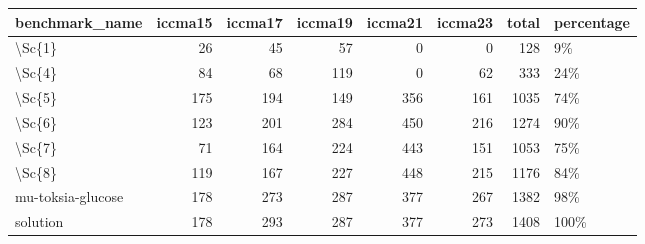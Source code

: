 \begin{tabular}{lrrrrrrl}
\toprule
benchmark\_name &  iccma15 &  iccma17 &  iccma19 &  iccma21 &  iccma23 &  total & percentage \\
\midrule
\textbackslash Sc\{1\}            &       26 &       45 &       57 &        0 &        0 &    128 &         9\% \\
\textbackslash Sc\{4\}            &       84 &       68 &      119 &        0 &       62 &    333 &        24\% \\
\textbackslash Sc\{5\}            &      175 &      194 &      149 &      356 &      161 &   1035 &        74\% \\
\textbackslash Sc\{6\}            &      123 &      201 &      284 &      450 &      216 &   1274 &        90\% \\
\textbackslash Sc\{7\}            &       71 &      164 &      224 &      443 &      151 &   1053 &        75\% \\
\textbackslash Sc\{8\}            &      119 &      167 &      227 &      448 &      215 &   1176 &        84\% \\
mu-toksia-glucose &      178 &      273 &      287 &      377 &      267 &   1382 &        98\% \\
solution          &      178 &      293 &      287 &      377 &      273 &   1408 &       100\% \\
\bottomrule
\end{tabular}
